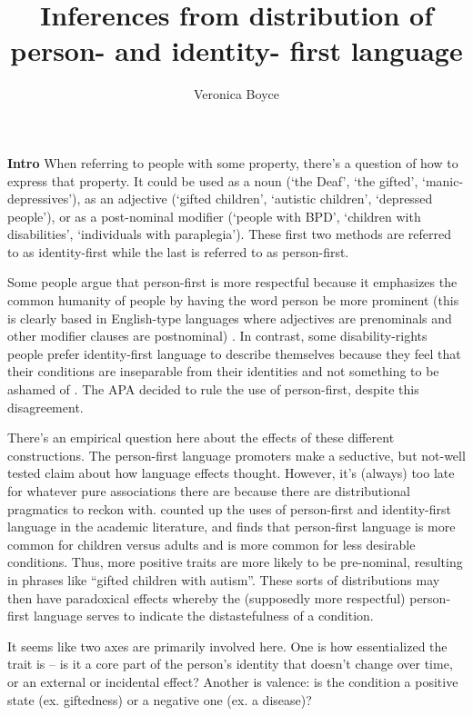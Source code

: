 \documentclass[11pt]{article}
\title{Inferences from distribution of person- and identity- first language}
\author{Veronica Boyce}
\begin{document}
	\maketitle

\textbf{Intro}
When referring to people with some property, there's a question of how to express that property. It could be used as a noun (`the Deaf', `the gifted', `manic-depressives'), as an adjective (`gifted children', `autistic children', `depressed people'), or as a post-nominal modifier (`people with BPD', `children with disabilities', `individuals with paraplegia'). These first two methods are referred to as identity-first while the last is referred to as person-first. 

Some people argue that person-first is more respectful because it emphasizes the common humanity of people by having the word person be more prominent (this is clearly based in English-type languages where adjectives are prenominals and other modifier clauses are postnominal) \cite{dunnPersonfirstIdentityfirstLanguage20150202}. In contrast, some disability-rights people prefer identity-first language to describe themselves because they feel that their conditions are inseparable from their identities and not something to be ashamed of \cite{dunnPersonfirstIdentityfirstLanguage20150202}. The APA decided to rule the use of person-first, despite this disagreement. 

There's an empirical question here about the effects of these different constructions. The person-first language promoters make a seductive, but not-well tested claim about how language effects thought.
However, it's (always) too late for whatever pure associations there are because there are distributional pragmatics to reckon with. \cite{gernsbacherEditorialPerspectiveUse2017} counted up the uses of person-first and identity-first language in the academic literature, and finds that person-first language is more common for children versus adults and is more common for less desirable conditions. Thus, more positive traits are more likely to be pre-nominal, resulting in phrases like ``gifted children with autism''. These sorts of distributions may then have paradoxical effects whereby the (supposedly more respectful) person-first language serves to indicate the distastefulness of a condition. 


It seems like two axes are primarily involved here. One is how essentialized the trait is -- is it a core part of the person's identity that doesn't change over time, or an external or incidental effect? Another is valence: is the condition a positive state (ex. giftedness) or a negative one (ex. a disease)? 
\end{document}

